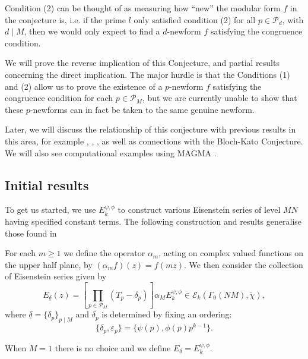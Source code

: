 \documentclass{amsart}
\theoremstyle{plain}
\theoremstyle{definition}
\begin{document}
Condition (2) can be thought of as measuring how ``new'' the modular form $f$ in the conjecture is, i.e. if the prime $l$ only satisfied condition (2) for all $p \in \mathcal{P}_d$, with $d \mid M$, then we would only expect to find a $d$-newform $f$ satisfying the congruence condition. 

We will prove the reverse implication of this Conjecture, and partial results concerning the direct implication. The major hurdle is that the Conditions (1) and (2) allow us to prove the existence of a $p$-newform $f$ satisfying the congruence condition for each $p \in \mathcal{P}_M$, but we are currently unable to show that these $p$-newforms can in fact be taken to the same genuine newform.

Later, we will discuss the relationship of this conjecture with previous results in this area, for example \cite{dummigan_2007}, \cite{billerey_menares_2016}, \cite{dummigan_fretwell_2014}, as well as connections with the Bloch-Kato Conjecture. We will also see computational examples using MAGMA \cite{magma}.

\subsection{Initial results}
To get us started, we use $E_k^{\psi,\phi}$ to construct various Eisenstein series of level $MN$ having specified constant terms. The following construction and results generalise those found in \cite[Section 1.2.2]{billerey_menares_2016}

For each $m\geq 1$ we define the operator $\alpha_m$, acting on complex valued functions on the upper half plane, by $(\alpha_m f)(z)=f(mz)$. We then consider the collection of Eisenstein series given by
\begin{equation}
\label{eq:E}
    E_{\underline{\delta}}(z)=\left[\prod_{p\in \mathcal{P}_M}(T_p - \delta_p)\right]\alpha_M E_k^{\psi,\phi}\in \mathcal{E}_k(\Gamma_0(NM),\tilde{\chi}),
\end{equation}
where $\underline{\delta} = \{\delta_p\}_{p\mid M}$ and $\delta_p$ is determined by fixing an ordering:
\begin{equation}
\label{eq:delta/eps}
    \{\delta_p, \varepsilon_p\} = \{\psi(p), \phi(p)p^{k-1}\}.
\end{equation} 

\noindent When $M=1$ there is no choice and we define $E_{\underline{\delta}} = E_k^{\psi,\phi}$.
\end{document}
